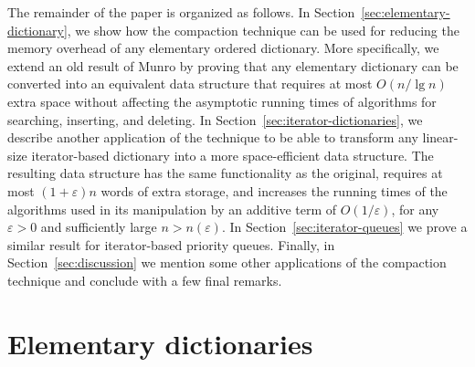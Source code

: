 \documentclass{DIKU-article}
\newcommand{\seclabel}[1]{\label{sec:#1}}
\newcommand{\secref}[1]{\mbox{Section~\ref{sec:#1}}}
\begin{document}
The remainder of the paper is organized as follows.  In
\secref{elementary-dictionary}, we show how the compaction technique
can be used for reducing the memory overhead of any elementary ordered
dictionary. More specifically, we extend an old result of Munro
\cite{Mun86} by proving that any elementary dictionary can be
converted into an equivalent data structure that requires at most
$O(n/\lg n)$ extra space without affecting the asymptotic running
times of algorithms for searching, inserting, and deleting.  In
\secref{iterator-dictionaries}, we describe another application of the
technique to be able to transform any linear-size iterator-based
dictionary into a more space-efficient data structure. The resulting
data structure has the same functionality as the original, requires at
most $(1 + \varepsilon)n$ words of extra storage, and increases the
running times of the algorithms used in its manipulation by an
additive term of $O(1/\varepsilon)$, for any $\varepsilon > 0$ and
sufficiently large $n > n(\varepsilon)$.  In \secref{iterator-queues}
we prove a similar result for iterator-based priority queues.
Finally, in \secref{discussion} we mention some other applications of
the compaction technique and conclude with a few final remarks.

\section{Elementary dictionaries}%
\seclabel{elementary-dictionaries}
\end{document}
